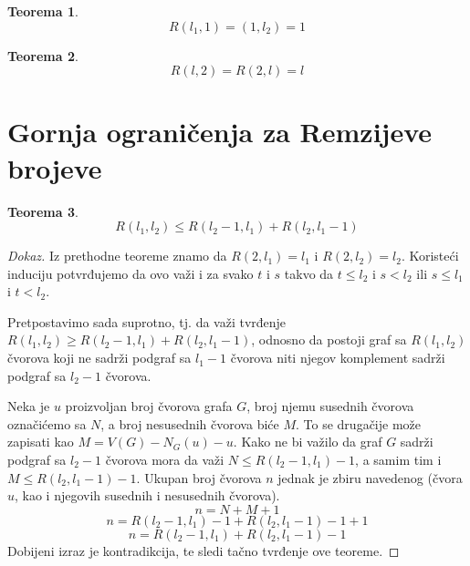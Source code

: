 \documentclass{article}
\theoremstyle{definition}
\newtheorem{teorema}{Teorema}[section]
\newcommand{\dokaz}[1]{\begin{proof}[Dokaz]#1\end{proof}}
\begin{document}

	\begin{teorema}
	\[
	R(l_1,1)= (1,l_2) = 1
	\]
	\end{teorema}
	\begin{teorema}
	\[
	R(l,2)=R(2,l)=l
	\]
	\end{teorema}

		\newpage

		\section{Gornja ograničenja za Remzijeve brojeve}

	\begin{teorema}
	\[
	R(l_1,l_2) \leq R(l_2-1, l_1) + R(l_2, l_1-1)
	\]
	\end{teorema}
	\dokaz{
	Iz prethodne teoreme znamo da $R(2,l_1)=l_1$ i $R(2,l_2)=l_2$. Koristeći induciju potvrđujemo da ovo važi i za svako $t$ i $s$ takvo da $t\leq l_2$ i $s<l_2$ ili $s\leq l_1$ i $t<l_2$.

	Pretpostavimo sada suprotno, tj. da važi tvrđenje $R(l_1,l_2) \geq R(l_2-1, l_1) + R(l_2, l_1-1)$, odnosno da postoji graf sa $R(l_1,l_2)$ čvorova koji ne sadrži podgraf sa $l_1-1$ čvorova niti njegov komplement sadrži podgraf sa $l_2-1$ čvorova.

	Neka je $u$ proizvoljan broj čvorova grafa $G$, broj njemu susednih čvorova označićemo sa $N$, a broj nesusednih čvorova biće $M$.
	To se drugačije može zapisati kao $M=V(G)-N_G(u)-{u}$.
	Kako ne bi važilo da graf $G$ sadrži podgraf sa $l_2-1$ čvorova mora da važi $N\leq R(l_2-1, l_1)-1 $, a samim tim i $M \leq R(l_2, l_1-1)-1 $. 
	Ukupan broj čvorova $n$ jednak je zbiru navedenog (čvora $u$, kao i njegovih susednih i nesusednih čvorova).
	\[
	n= N+M+1
	\]
	\[
	n= R(l_2-1, l_1)-1 + R(l_2, l_1-1)-1+1
	\]
	\[
	n= R(l_2-1, l_1)+ R(l_2, l_1-1)-1
	\]
	Dobijeni izraz je kontradikcija, te sledi tačno tvrđenje ove teoreme.
	}
	
\end{document}
